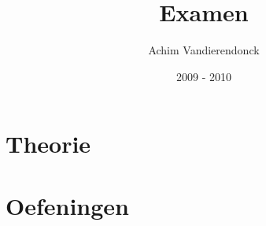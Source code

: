 \documentclass[a4paper]{article}
\title{Examen}
\author{Achim Vandierendonck}
\date{2009 - 2010}
\begin{document}
\maketitle

\section{Theorie}
\section{Oefeningen}
\end{document}
